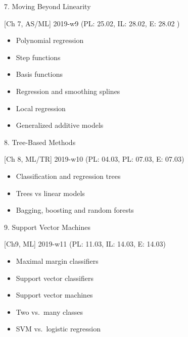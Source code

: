 \documentclass[10pt,ignorenonframetext,]{beamer}
\providecommand{\tightlist}{%
  \setlength{\itemsep}{0pt}\setlength{\parskip}{0pt}}
\begin{document}
\begin{frame}

\begin{block}{7. Moving Beyond Linearity}

{[}Ch 7, AS/ML{]} 2019-w9 (PL: 25.02, IL: 28.02, E: 28.02 )

\begin{itemize}
\tightlist
\item
  Polynomial regression
\item
  Step functions
\item
  Basis functions
\item
  Regression and smoothing splines
\item
  Local regression
\item
  Generalized additive models
\end{itemize}

\end{block}

\end{frame}

\begin{frame}

\begin{block}{8. Tree-Based Methods}

{[}Ch 8, ML/TR{]} 2019-w10 (PL: 04.03, PL: 07.03, E: 07.03)

\begin{itemize}
\tightlist
\item
  Classification and regression trees
\item
  Trees vs linear models
\item
  Bagging, boosting and random forests
\end{itemize}

\end{block}

\begin{block}{9. Support Vector Machines}

{[}Ch9, ML{]} 2019-w11 (PL: 11.03, IL: 14.03, E: 14.03)

\begin{itemize}
\tightlist
\item
  Maximal margin classifiers
\item
  Support vector classifiers
\item
  Support vector machines
\item
  Two vs.~many classes
\item
  SVM vs.~logistic regression
\end{itemize}

\end{block}

\end{frame}
\end{document}

